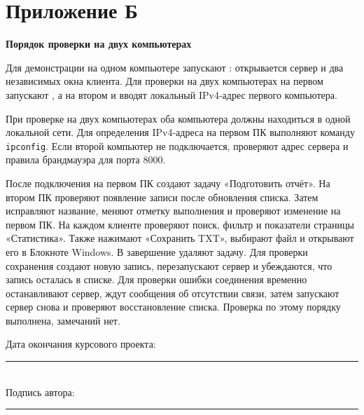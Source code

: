 \chapter*{Приложение Б}
\begin{center}\textbf{Порядок проверки на двух компьютерах}\end{center}

Для демонстрации на одном компьютере запускают : открывается сервер и два независимых окна клиента. Для проверки на двух компьютерах на первом запускают , а на втором  и вводят локальный IPv4-адрес первого компьютера.

При проверке на двух компьютерах оба компьютера должны находиться в одной локальной сети. Для определения IPv4-адреса на первом ПК выполняют команду \texttt{ipconfig}. Если второй компьютер не подключается, проверяют адрес сервера и правила брандмауэра для порта 8000.

После подключения на первом ПК создают задачу «Подготовить отчёт». На втором ПК проверяют появление записи после обновления списка. Затем исправляют название, меняют отметку выполнения и проверяют изменение на первом ПК. На каждом клиенте проверяют поиск, фильтр и показатели страницы «Статистика». Также нажимают «Сохранить TXT», выбирают файл и открывают его в Блокноте Windows. В завершение удаляют задачу. Для проверки сохранения создают новую запись, перезапускают сервер и убеждаются, что запись осталась в списке. Для проверки ошибки соединения временно останавливают сервер, ждут сообщения об отсутствии связи, затем запускают сервер снова и проверяют восстановление списка. Проверка по этому порядку выполнена, замечаний нет.

\vfill
\noindent Дата окончания курсового проекта: \rule{53mm}{0.4pt}\\[6mm]
\noindent Подпись автора: \rule{77mm}{0.4pt}
